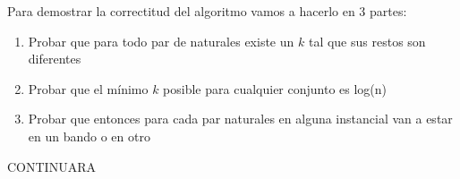 Para demostrar la correctitud del algoritmo vamos a hacerlo en 3 partes:
\begin{enumerate}
\item Probar que para todo par de naturales existe un $k$ tal que sus restos son diferentes
\item Probar que el mínimo $k$ posible para cualquier conjunto es log(n) 
\item Probar que entonces para cada par naturales en alguna instancial van a estar en un bando o en otro
\end{enumerate}

CONTINUARA



